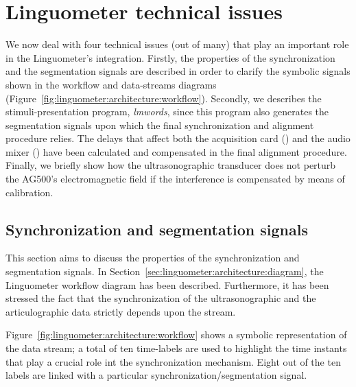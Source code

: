 \section{Linguometer technical issues}
\label{ch:linguometer:technical}
We now deal with four technical issues
(out of many) that play an important role in the Linguometer's integration.
Firstly, the properties of the  synchronization and the segmentation signals 
are described in order to  clarify the symbolic signals
shown in the workflow and data-streams diagrams
(Figure~\ref{fig:linguometer:architecture:workflow}).
Secondly, we describes the stimuli-presentation program, \emph{lmwords},
since this program also generates the segmentation signals upon which the final
synchronization and alignment procedure relies.
The delays that affect both the acquisition card () and the audio mixer
() have been calculated and compensated in the final
alignment procedure.
Finally, we briefly show how the ultrasonographic transducer does not
perturb the AG500's electromagnetic field if the interference is compensated by
means of calibration.
\subsection{Synchronization and segmentation signals}
\label{sec:linguometer:technical:signals}
This section aims to discuss the properties of the synchronization and
segmentation signals. 
In Section~\ref{sec:linguometer:architecture:diagram},
the Linguometer workflow diagram has been described. 
Furthermore, it has been stressed the fact that the synchronization of the 
ultrasonographic and the articulographic data strictly depends upon the 
 stream.


Figure~\ref{fig:linguometer:architecture:workflow} shows a symbolic
representation of the data  stream; 
a total of ten time-labels are used to highlight the time instants that play a
crucial role int the synchronization mechanism. 
Eight out of the ten labels are linked with a particular
synchronization/segmentation signal.

